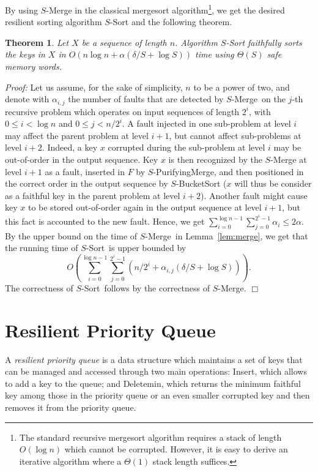 \documentclass[review,number]{elsarticle}
\newcommand{\BO}[1]{{O}\left(#1\right)}
\newcommand{\BT}[1]{{\Theta}\left(#1\right)}
\newtheorem{theorem}{Theorem}
\renewenvironment{proof}{\begin{trivlist}
                         \item[] {\em Proof:}}{\hfill $\Box$
                       \end{trivlist}}
\newcommand{\SMerge}{$S$-\textsf{Merge}}
\newcommand{\SSort}{$S$-\textsf{Sort}}
\newcommand{\SPurifyingMerge}{$S$-\textsf{PurifyingMerge}}
\newcommand{\SBucketSort}{$S$-\textsf{BucketSort}}
\newcommand{\Insert}{\textsf{Insert}}
\newcommand{\Deletemin}{\textsf{Deletemin}}
\begin{document}
By using \SMerge{} in the classical mergesort algorithm\footnote{The standard
recursive mergesort algorithm requires a stack of length $\BO{\log n}$ which
cannot be corrupted. However, it is easy to derive an iterative algorithm where
a $\BT{1}$ stack length suffices.}, we get the desired resilient sorting
algorithm \SSort{} and the following theorem.
\begin{theorem}
Let $X$ be a sequence of length $n$. Algorithm \SSort{} faithfully sorts the
keys in $X$ in $\BO{n \log n+  \alpha  \left(\delta/S + \log S\right)}$ time
using $\BT{S}$ safe memory words.
\end{theorem}
\begin{proof}
Let us assume, for the sake of simplicity, $n$ to be a power of two, and denote
with $\alpha_{i,j}$ the number of faults that are detected by \SMerge\ on the
$j$-th recursive problem which operates on input sequences of length $2^i$, with
$0\leq i < \log n$ and $0\leq j < n/2^i$.
A fault injected in one sub-problem at level $i$ may affect the parent
problem at level $i+1$, but cannot affect sub-problems at level $i+2$. Indeed,
a key $x$ corrupted during the sub-problem at level $i$ may be out-of-order in
the output sequence. Key $x$ is then recognized by the \SMerge{} at
level $i+1$ as a fault, inserted in $F$ by \SPurifyingMerge{}, and then
positioned in the correct order in the output sequence by
\SBucketSort{} ($x$ will thus be consider as a faithful key in the parent
problem at level $i+2$). Another fault might cause key $x$ to be stored
out-of-order
again in the output sequence at level $i+1$, but this fact is accounted to the
new fault. Hence, we get $\sum_{i=0}^{\log n-1} \sum_{j=0}^{2^i-1} \alpha_i
\leq 2\alpha$. By the upper bound on the time of \SMerge\
in Lemma~\ref{lem:merge}, we get that the running time of \SSort\ is
upper bounded by 
$$ \BO{\sum_{i=0}^{\log n-1} \sum_{j=0}^{2^i-1}
\left(n/2^i+\alpha_{i,j} \left(\delta /S + \log S \right)\right)}.$$ 
The correctness of \SSort\ follows by the correctness of \SMerge.
\end{proof}




\section{Resilient Priority Queue}\label{sec:pqueue}

A \emph{resilient priority queue} is a data structure which 
maintains a set of keys that can be managed and accessed through two main 
operations: \Insert{}, which allows to add a key to the queue; and \Deletemin{}, 
which returns the minimum faithful key among those in the priority queue or
an even smaller corrupted key and then removes it from the priority queue. 
\end{document}
